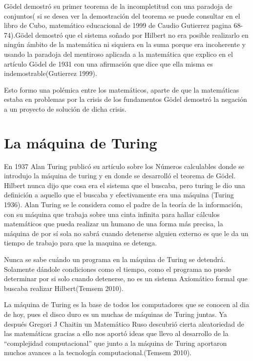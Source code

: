\documentclass{article}
\begin{document}
Gödel demostró su primer teorema de la incompletitud con una paradoja de conjuntos( si se desea ver la demostración del teorema se puede consultar en el libro de Cubo, matemático educacional de 1999 de Caudio Gutierrez pagina 68-74).Gödel demostró que el sistema soñado por Hilbert no era posible realizarlo en ningún ámbito de la matemática ni siquiera en la suma porque era incoherente y usando la paradoja  del mentiroso aplicada a la matemática que explico en el artículo Gödel de 1931 con una afirmación que dice que ella misma es indemostrable(Gutierrez  1999).
\vspace{10pt}

Esto formo una polémica entre los matemáticos, aparte de que la matemáticas estaba en problemas por la crisis de los fundamentos Gödel demostró la negación a un proyecto de solución de dicha crisis.

\section{La máquina de Turing}
En 1937 Alan Turing publicó su artículo sobre los Números calculables donde se introdujo la máquina de turing y en donde se desarrolló el teorema de Gödel. Hilbert nunca dijo que cosa era el sistema que el buscaba, pero turing le dio una definición a aquello que el buscaba y efectivamente era una máquina (Turing 1936).
Alan Turing se le considera como el padre de la teoría de la información, con su máquina que trabaja sobre una cinta infinita para hallar cálculos matemáticos que pueda realizar un humano de una forma más precisa, la máquina de por sí sola no sabrá cuando detenerse alguien externo es que le da un tiempo de trabajo para que la maquina se detenga.

\vspace{10pt}

Nunca se sabe cuándo un programa en la máquina de Turing se detendrá. Solamente dándole condiciones como el tiempo, como el programa no puede determinar por si solo cuando detenerse, no es un sistema Axiomático formal que buscaba realizar Hilbert(Temsem 2010).

\vspace{10pt}
La máquina de Turing es la base de todos los computadores que se conocen al dia de hoy, pues el disco duro es un muchas de máquinas de Turing juntas.
Ya después Gregori J Chaitin un Matemático Ruso descubrió cierta aleatoriedad de las matemáticas gracias a ello nos aportó ideas que llevo al desarrollo de la “complejidad computacional” que junto a la máquina de Turing aportaron muchos avances a la tecnología computacional.(Temsem 2010).
\end{document}
